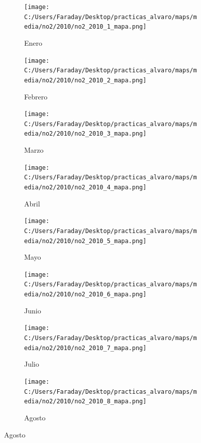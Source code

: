 \documentclass[12pt]{beamer}
\begin{document}
\begin{frame}[squeeze]
\tiny
\begin{figure}[H]
\centering
\begin{subfigure}[H]{0.20\textwidth}
\texttt{[image: C:/Users/Faraday/Desktop/practicas\_alvaro/maps/media/no2/2010/no2\_2010\_1\_mapa.png]}
\captionsetup{labelformat=empty}
\caption{\scriptsize Enero}
\label{fig:map-no2-2010-1}
\end{subfigure}
%
\begin{subfigure}[H]{0.20\textwidth}
\texttt{[image: C:/Users/Faraday/Desktop/practicas\_alvaro/maps/media/no2/2010/no2\_2010\_2\_mapa.png]}
\captionsetup{labelformat=empty}
\caption{\scriptsize Febrero}
\label{fig:map-no2-2010-2}
\end{subfigure}
%
\begin{subfigure}[H]{0.20\textwidth}
\texttt{[image: C:/Users/Faraday/Desktop/practicas\_alvaro/maps/media/no2/2010/no2\_2010\_3\_mapa.png]}
\captionsetup{labelformat=empty}
\caption{\scriptsize Marzo}
\label{fig:map-no2-2010-3}
\end{subfigure}
%
\begin{subfigure}[H]{0.20\textwidth}
\texttt{[image: C:/Users/Faraday/Desktop/practicas\_alvaro/maps/media/no2/2010/no2\_2010\_4\_mapa.png]}
\captionsetup{labelformat=empty}
\caption{\scriptsize Abril}
\label{fig:map-no2-2010-4}
\end{subfigure}

\begin{subfigure}[H]{0.20\textwidth}
\texttt{[image: C:/Users/Faraday/Desktop/practicas\_alvaro/maps/media/no2/2010/no2\_2010\_5\_mapa.png]}
\captionsetup{labelformat=empty}
\caption{\scriptsize Mayo}
\label{fig:map-no2-2010-5}
\end{subfigure}
%
\begin{subfigure}[H]{0.20\textwidth}
\texttt{[image: C:/Users/Faraday/Desktop/practicas\_alvaro/maps/media/no2/2010/no2\_2010\_6\_mapa.png]}
\captionsetup{labelformat=empty}
\caption{\scriptsize Junio}
\label{fig:map-no2-2010-6}
\end{subfigure}
%
\begin{subfigure}[H]{0.20\textwidth}
\texttt{[image: C:/Users/Faraday/Desktop/practicas\_alvaro/maps/media/no2/2010/no2\_2010\_7\_mapa.png]}
\captionsetup{labelformat=empty}
\caption{\scriptsize Julio}
\label{fig:map-no2-2010-7}
\end{subfigure}
%
\begin{subfigure}[H]{0.20\textwidth}
\texttt{[image: C:/Users/Faraday/Desktop/practicas\_alvaro/maps/media/no2/2010/no2\_2010\_8\_mapa.png]}
\captionsetup{labelformat=empty}
\caption{\scriptsize Agosto}
\label{fig:map-no2-2010-8}
\end{subfigure}


\end{figure}
\end{frame}
\end{document}
